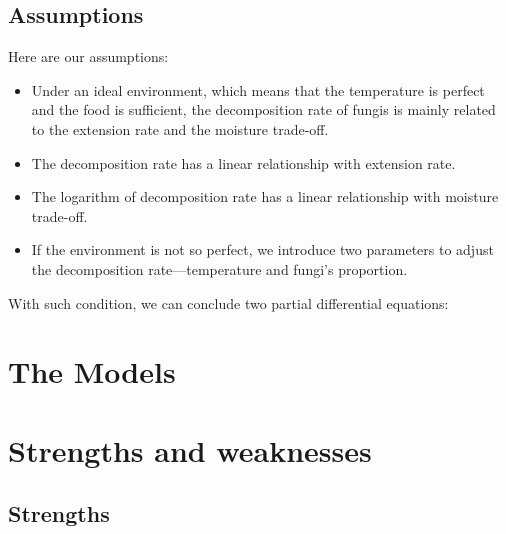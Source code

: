 \documentclass{mcmthesis}
\begin{document}
\subsection{Assumptions}
Here are our assumptions:
\begin{itemize}
  \item Under an ideal environment, which means that the temperature is perfect and the food is sufficient, the decomposition rate of fungis is mainly related to the extension rate and the moisture trade-off.
  \item The decomposition rate has a linear relationship with extension rate.
  \item The logarithm of decomposition rate has a linear relationship with moisture trade-off.
  \item If the environment is not so perfect, we introduce two parameters to adjust the decomposition rate---temperature and fungi's proportion.
\end{itemize}

With such condition, we can conclude two partial differential equations:


\section{The Models}

\section{Strengths and weaknesses}

\subsection{Strengths}
\cite{bush2006mathematical}


\medskip


\end{document}
